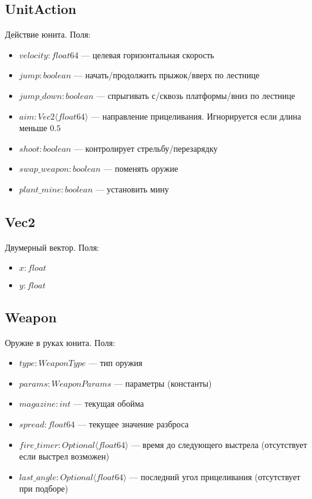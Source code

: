 \subsection{UnitAction}
Действие юнита. Поля:
\begin{itemize}
    \item $velocity : float64$ --- целевая горизонтальная скорость
    \item $jump : boolean$ --- начать/продолжить прыжок/вверх по лестнице
    \item $jump\_down : boolean$ --- спрыгивать с/сквозь платформы/вниз по лестнице
    \item $aim : Vec2 \langle float64 \rangle$ --- направление прицеливания. Игнорируется если длина меньше $0.5$
    \item $shoot : boolean$ --- контролирует стрельбу/перезарядку
    \item $swap\_weapon : boolean$ --- поменять оружие
    \item $plant\_mine : boolean$ --- установить мину
\end{itemize}

\subsection{Vec2}
Двумерный вектор. Поля:
\begin{itemize}
    \item $x : float$
    \item $y : float$
\end{itemize}

\subsection{Weapon}
Оружие в руках юнита. Поля:
\begin{itemize}
    \item $type : WeaponType$ --- тип оружия
    \item $params : WeaponParams$ --- параметры (константы)
    \item $magazine : int$ --- текущая обойма
    \item $spread : float64$ --- текущее значение разброса
    \item $fire\_timer : Optional \langle float64 \rangle$ --- время до следующего выстрела (отсутствует если выстрел возможен)
    \item $last\_angle : Optional \langle float64 \rangle$ --- последний угол прицеливания (отсутствует при подборе)
\end{itemize}

